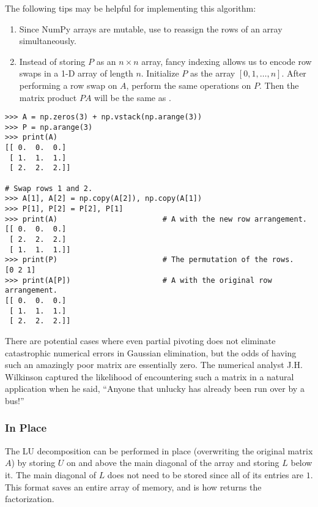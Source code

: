 The following tips may be helpful for implementing this algorithm:
\begin{enumerate}
    \item Since NumPy arrays are mutable, use  to reassign the rows of an array simultaneously.
    \item Instead of storing $P$ as an $n \times n$ array, fancy indexing allows us to encode row swaps in a 1-D array of length $n$.
    Initialize $P$ as the array $[0, 1, \ldots, n]$.
    After performing a row swap on $A$, perform the same operations on $P$.
    Then the matrix product $PA$ will be the same as .
    \label{tip:lu-decomposition-with-pivoting-P}
\end{enumerate}

\begin{lstlisting}
>>> A = np.zeros(3) + np.vstack(np.arange(3))
>>> P = np.arange(3)
>>> print(A)
[[ 0.  0.  0.]
 [ 1.  1.  1.]
 [ 2.  2.  2.]]

# Swap rows 1 and 2.
>>> A[1], A[2] = np.copy(A[2]), np.copy(A[1])
>>> P[1], P[2] = P[2], P[1]
>>> print(A)                        # A with the new row arrangement.
[[ 0.  0.  0.]
 [ 2.  2.  2.]
 [ 1.  1.  1.]]
>>> print(P)                        # The permutation of the rows.
[0 2 1]
>>> print(A[P])                     # A with the original row arrangement.
[[ 0.  0.  0.]
 [ 1.  1.  1.]
 [ 2.  2.  2.]]
\end{lstlisting}

There are potential cases where even partial pivoting does not eliminate catastrophic numerical errors in Gaussian elimination, but the odds of having such an amazingly poor matrix are essentially zero.
The numerical analyst J.H. Wilkinson captured the likelihood of encountering such a matrix in a natural application when he said, ``Anyone that unlucky has already been run over by a bus!''

\subsubsection*{In Place} %

The LU decomposition can be performed in place (overwriting the original matrix $A$) by storing $U$ on and above the main diagonal of the array and storing $L$ below it.
The main diagonal of $L$ does not need to be stored since all of its entries are $1$.
This format saves an entire array of memory, and is how  returns the factorization.

